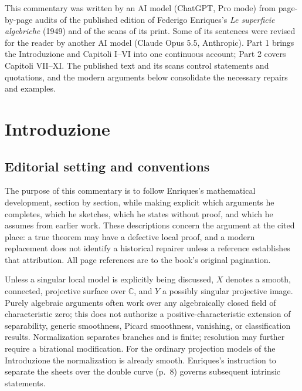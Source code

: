 This commentary was written by an AI model (ChatGPT, Pro mode) from page-by-page audits of the published edition of Federigo Enriques's \emph{Le superficie algebriche} (1949) and of the scans of its print. Some of its sentences were revised for the reader by another AI model (Claude Opus 5.5, Anthropic). Part 1 brings the Introduzione and Capitoli I--VI into one continuous account; Part 2 covers Capitoli VII--XI. The published text and its scans control statements and quotations, and the modern arguments below consolidate the necessary repairs and examples.

\chapter*{Introduzione}
\label{enriques-introduzione}

\section*{Editorial setting and conventions}

The purpose of this commentary is to follow Enriques's mathematical development, section by section, while making explicit which arguments he completes, which he sketches, which he states without proof, and which he assumes from earlier work. These descriptions concern the argument at the cited place: a true theorem may have a defective local proof, and a modern replacement does not identify a historical repairer unless a reference establishes that attribution. All page references are to the book's original pagination.

Unless a singular local model is explicitly being discussed, \(X\) denotes a smooth, connected, projective surface over \(\mathbb C\), and \(Y\) a possibly singular projective image. Purely algebraic arguments often work over any algebraically closed field of characteristic zero; this does not authorize a positive-characteristic extension of separability, generic smoothness, Picard smoothness, vanishing, or classification results. Normalization separates branches and is finite; resolution may further require a birational modification. For the ordinary projection models of the Introduzione the normalization is already smooth. Enriques's instruction to separate the sheets over the double curve (p.~8) governs subsequent intrinsic statements.

